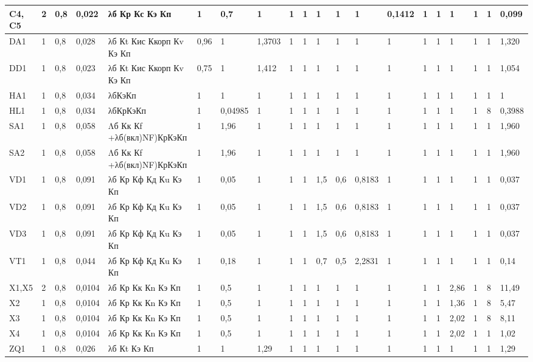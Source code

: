 \begin{enumerate}
\begin{sidewaystable}
\begin{tabular}{|l |l |l |l |l |l |l |l |l |l |l |l |l |l |l |l |l |l |l |l |}
C4, C5     & 2 & 0,8 & 0,022 & λб Кр Кс Кэ Кп  & 1 & 0,7 & 1 & 1 & 1 & 1 & 1 & 1 & 0,1412 & 1 & 1 & 1 & 1 & 1 & 0,099 \\ \hline
DA1        & 1 & 0,8 & 0,028 & λб Кt Кис Ккорп Кv Кэ Кп & 0,96 & 1 & 1,3703 & 1 & 1 & 1 & 1 & 1 & 1 & 1 & 1 & 1 & 1 & 1 & 1,320 \\ \hline
DD1        & 1 & 0,8 & 0,023 & λб Кt Кис Ккорп Кv Кэ Кп & 0,75 & 1 & 1,412 & 1 & 1 & 1 & 1 & 1 & 1 & 1 & 1 & 1 & 1 & 1 & 1,054 \\ \hline
HA1        & 1 & 0,8 & 0,034 & λбКэКп & 1 & 1 & 1 & 1 & 1 & 1 & 1 & 1 & 1 & 1 & 1 & 1 & 1 & 1 & 1 \\ \hline
HL1        & 1 & 0,8 & 0,034 & λбКрКэКп & 1 & 0,04985 & 1 & 1 & 1 & 1 & 1 & 1 & 1 & 1 & 1 & 1 & 1 & 8 & 0,3988 \\ \hline
SA1        & 1 & 0,8 & 0,058 & Λб Кк Кf +λб(вкл)NF)КрКэКп & 1 & 1,96 & 1 & 1 & 1 & 1 & 1 & 1 & 1 & 1 & 1 & 1 & 1 & 1 & 1,960 \\ \hline
SA2        & 1 & 0,8 & 0,058 & Λб Кк Кf +λб(вкл)NF)КрКэКп & 1 & 1,96 & 1 & 1 & 1 & 1 & 1 & 1 & 1 & 1 & 1 & 1 & 1 & 1 & 1,960 \\ \hline
VD1        & 1 & 0,8 & 0,091 & λб Кр Кф Кд Кu Кэ Кп    & 1 & 0,05 & 1 & 1 & 1 & 1,5 & 0,6 & 0,8183 & 1 & 1 & 1 & 1 & 1 & 1 & 0,037 \\ \hline
VD2        & 1 & 0,8 & 0,091 & λб Кр Кф Кд Кu Кэ Кп    & 1 & 0,05 & 1 & 1 & 1 & 1,5 & 0,6 & 0,8183 & 1 & 1 & 1 & 1 & 1 & 1 & 0,037 \\ \hline
VD3        & 1 & 0,8 & 0,091 & λб Кр Кф Кд Кu Кэ Кп    & 1 & 0,05 & 1 & 1 & 1 & 1,5 & 0,6 & 0,8183 & 1 & 1 & 1 & 1 & 1 & 1 & 0,037 \\ \hline
VT1        & 1 & 0,8 & 0,044 & λб Кр Кф Кд Кu Кэ Кп    & 1 & 0,18 & 1 & 1 & 1 & 0,7 & 0,5 & 2,2831 & 1 & 1 & 1 & 1 & 1 & 1 & 0,14 \\ \hline
X1,X5      & 2 & 0,8 & 0,0104 & λб Кр Кк Кn Кэ Кп  & 1 & 0,5 & 1 & 1 & 1 & 1 & 1 & 1 & 1 & 1 & 1 & 2,86 & 1 & 8 & 11,49 \\ \hline
X2         & 1 & 0,8 & 0,0104 & λб Кр Кк Кn Кэ Кп  & 1 & 0,5 & 1 & 1 & 1 & 1 & 1 & 1 & 1 & 1 & 1 & 1,36 & 1 & 8 & 5,47 \\ \hline
X3         & 1 & 0,8 & 0,0104 & λб Кр Кк Кn Кэ Кп  & 1 & 0,5 & 1 & 1 & 1 & 1 & 1 & 1 & 1 & 1 & 1 & 2,02 & 1 & 8 & 8,11 \\ \hline
X4         & 1 & 0,8 & 0,0104 & λб Кр Кк Кn Кэ Кп  & 1 & 0,5 & 1 & 1 & 1 & 1 & 1 & 1 & 1 & 1 & 1 & 2,02 & 1 & 1 & 1,02 \\ \hline
ZQ1        & 1 & 0,8 & 0,026 & λб Кt Кэ Кп         & 1 & 1 & 1,29 & 1 & 1 & 1 & 1 & 1 & 1 & 1 & 1 & 1 & 1 & 1 & 1,29 \\ \hline
    

\end{tabular}
\end{sidewaystable}
\end{enumerate}
